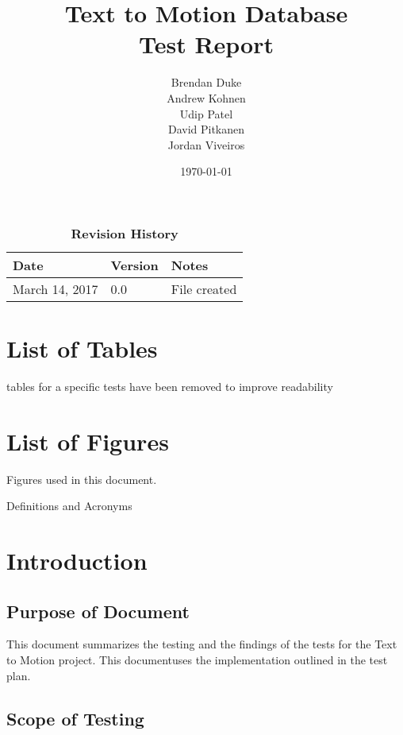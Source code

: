\documentclass{scrreprt}
\begin{document}
\title{\bf Text to Motion Database\\[\baselineskip]\Large Test Report}
\author{Brendan Duke\\Andrew Kohnen\\Udip Patel\\David Pitkanen\\Jordan Viveiros}
\date{\today}

\maketitle
{}
\tableofcontents


\begin{table}[bp]
\caption*{\bf Revision History}
\begin{tabularx}{\textwidth}{p{3.5cm}p{2cm}X}
\toprule {\bf Date} & {\bf Version} & {\bf Notes}\\
\midrule
March 14, 2017 & 0.0 & File created\\
\bottomrule
\end{tabularx}
\end{table}

\newpage



\chapter{List of Tables}
    tables for a specific tests have been removed to improve readability

\chapter{List of Figures}
    Figures used in this document.

    Definitions and Acronyms

\chapter{Introduction}

\section{Purpose of Document}
    This document summarizes the testing and the findings of the tests for the Text to Motion project. This documentuses the implementation outlined in the test plan.

\section{Scope of Testing}
\end{document}
